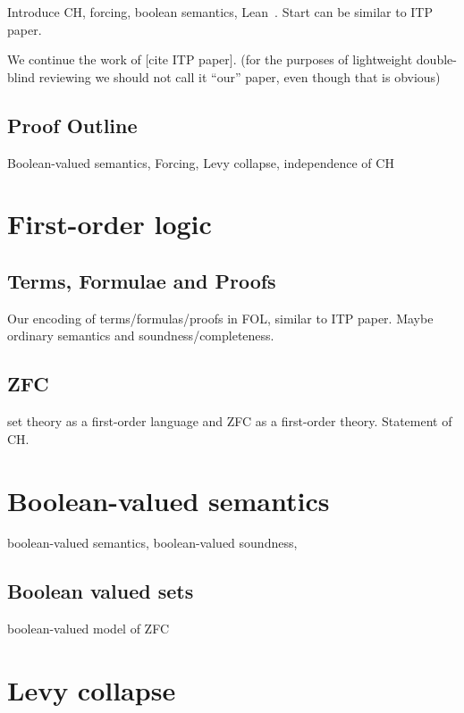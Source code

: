 \documentclass[sigplan,10pt,review]{acmart} %
\begin{document}
Introduce CH, forcing, boolean semantics, Lean~\cite{de2015lean}. Start can be similar to ITP paper.

We continue the work of [cite ITP paper]. (for the purposes of lightweight double-blind reviewing we should not call it ``our'' paper, even though that is obvious)

\subsection{Proof Outline}
\label{subsection:intro:outline}
Boolean-valued semantics, Forcing, Levy collapse, independence of CH

\section{First-order logic}
\label{section:fol}

\subsection{Terms, Formulae and Proofs}
\label{subsection:fol:terms}

Our encoding of terms/formulas/proofs in FOL, similar to ITP paper.
Maybe ordinary semantics and soundness/completeness.

\subsection{ZFC}
\label{subsection:fol:zfc}

set theory as a first-order language and ZFC as a first-order theory. Statement of CH.

\section{Boolean-valued semantics}
\label{section:boolean-semantics}

boolean-valued semantics, boolean-valued soundness,

\subsection{Boolean valued sets}
\label{subsection:fol:bset}

boolean-valued model of ZFC

\section{Levy collapse}
\label{section:collapse}
\end{document}
